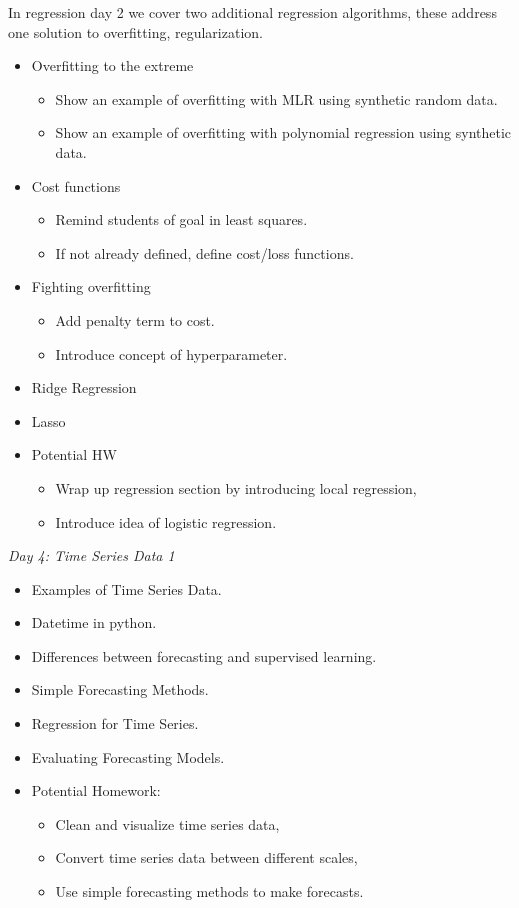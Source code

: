\documentclass[12pt]{article}
\begin{document}
	\noindent
	In regression day 2 we cover two additional regression algorithms, these address one solution to overfitting, regularization.
	\begin{itemize}
		\item Overfitting to the extreme
			\begin{itemize}
				\item Show an example of overfitting with MLR using synthetic random data.
				\item Show an example of overfitting with polynomial regression using synthetic data.
			\end{itemize}
		\item Cost functions
			\begin{itemize}
				\item Remind students of goal in least squares.
				\item If not already defined, define cost/loss functions.
			\end{itemize}
		\item Fighting overfitting
			\begin{itemize}
				\item Add penalty term to cost.
				\item Introduce concept of hyperparameter.
			\end{itemize}
		\item Ridge Regression
		\item Lasso
		\item Potential HW
			\begin{itemize}
				\item Wrap up regression section by introducing local regression,
				\item Introduce idea of logistic regression.
			\end{itemize}
	\end{itemize}

	\vspace{2mm}
	\noindent
	\textit{\large{Day 4: Time Series Data 1}} 
	\begin{itemize}
		\item Examples of Time Series Data.
		\item Datetime in python.
		\item Differences between forecasting and supervised learning.
		\item Simple Forecasting Methods.
		\item Regression for Time Series.
		\item Evaluating Forecasting Models.
		\item Potential Homework:
		\begin{itemize}
			\item Clean and visualize time series data,
			\item Convert time series data between different scales,
			\item Use simple forecasting methods to make forecasts.
		\end{itemize}
	\end{itemize}
	
\end{document}
